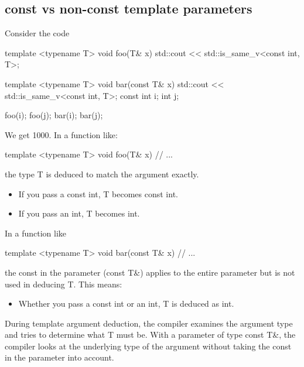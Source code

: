 \documentclass{report}
\begin{document}
\subsection{const vs non-const template parameters}
\bigbreak \noindent 
Consider the code
\bigbreak \noindent 
\begin{cppcode}
template <typename T>
void foo(T& x)
{
    std::cout << std::is_same_v<const int, T>;
}

template <typename T>
void bar(const T& x)
{
    std::cout << std::is_same_v<const int, T>;
}
const int i{};
int j{};

foo(i);
foo(j);
bar(i);
bar(j);
\end{cppcode}
\bigbreak \noindent 
We get 1000.
\bigbreak \noindent 
In a function like:
\bigbreak \noindent 
\begin{cppcode}
template <typename T>
void foo(T& x)
{
    // ...
}
\end{cppcode}
\bigbreak \noindent 
the type T is deduced to match the argument exactly.
\begin{itemize}
    \item If you pass a const int, T becomes const int.
    \item If you pass an int, T becomes int.
\end{itemize}
\bigbreak \noindent 
In a function like
\bigbreak \noindent 
\begin{cppcode}
template <typename T>
void bar(const T& x)
{
    // ...
}
\end{cppcode}
\bigbreak \noindent 
the const in the parameter (const T\&) applies to the entire parameter but is not used in deducing T. This means:
\begin{itemize}
    \item Whether you pass a const int or an int, T is deduced as int.
\end{itemize}
\bigbreak \noindent 
During template argument deduction, the compiler examines the argument type and tries to determine what T must be. With a parameter of type const T\&, the compiler looks at the underlying type of the argument without taking the const in the parameter into account.
\end{document}
